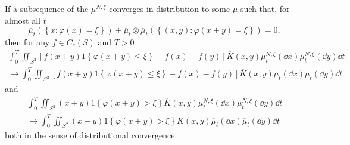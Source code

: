 \begin{lemma}
If a subsequence of the $\mu^{N,\xi}$ converges in distribution to some $\overline{\mu}$ such that, for almost all $t$
\begin{equation*}
    \overline{\mu}_t\left(\left\{x\colon \varphi(x) = \xi\right\}\right) + 
    \overline{\mu}_t \otimes \overline{\mu}_t \left(\left\{(x,y) \colon \varphi(x+y) = \xi\right\}\right) = 0,
\end{equation*}
then for any $f\in C_c(S)$ and $T> 0$
\begin{multline*}
    \int_0^T \iint_{S^2}\left[f(x+y)1\left\{\varphi(x+y) \leq \xi \right\} - f(x) - f(y)\right]
      \overline{K}(x,y)\mu^{N,\xi}_t(\dd x)\mu^{N,\xi}_t(\dd y)\dd t
    \\\rightarrow
    \int_0^T \iint_{S^2}\left[f(x+y)1\left\{\varphi(x+y) \leq \xi \right\} - f(x) - f(y)\right]
      \overline{K}(x,y)\overline{\mu}_t(\dd x)\overline{\mu}_t(\dd y)\dd t
\end{multline*}
and
\begin{multline*}
    \int_0^T \iint_{S^2}(x+y)1\left\{\varphi(x+y) > \xi \right\}
      \overline{K}(x,y)\mu^{N,\xi}_t(\dd x)\mu^{N,\xi}_t(\dd y)\dd t
    \\\rightarrow
    \int_0^T \iint_{S^2}(x+y)1\left\{\varphi(x+y) > \xi \right\}
      \overline{K}(x,y)\overline{\mu}_t(\dd x)\overline{\mu}_t(\dd y)\dd t
\end{multline*}
both in the sense of distributional convergence.
\end{lemma}
